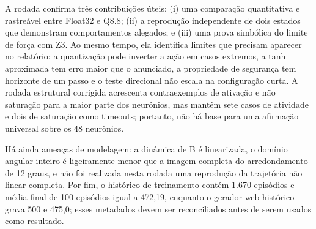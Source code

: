 A rodada confirma três contribuições úteis: (i) uma comparação quantitativa e
rastreável entre Float32 e Q8.8; (ii) a reprodução independente de dois estados
que demonstram comportamentos alegados; e (iii) uma prova simbólica do limite de
força com Z3. Ao mesmo tempo, ela identifica limites que precisam aparecer no
relatório: a quantização pode inverter a ação em casos extremos, a tanh
aproximada tem erro maior que o anunciado, a propriedade de segurança tem
horizonte de um passo e o teste direcional não escala na configuração curta.
A rodada estrutural corrigida acrescenta contraexemplos de ativação e não
saturação para a maior parte dos neurônios, mas mantém sete casos de atividade
e dois de saturação como timeouts; portanto, não há base para uma afirmação
universal sobre os 48 neurônios.

Há ainda ameaças de modelagem: a dinâmica de B é linearizada, o domínio angular
inteiro é ligeiramente menor que a imagem completa do arredondamento de 12 graus,
e não foi realizada nesta rodada uma reprodução da trajetória não linear completa.
Por fim, o histórico de treinamento contém 1.670 episódios e média final de 100
episódios igual a 472,19, enquanto o gerador web histórico grava 500 e 475,0;
esses metadados devem ser reconciliados antes de serem usados como resultado.
